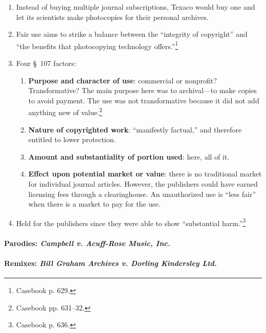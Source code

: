 \begin{enumerate}
    \item Instead of buying multiple journal subscriptions, Texaco would buy 
    one and let its scientists make photocopies for their personal archives.
    \item Fair use aims to strike a balance between the ``integrity of 
    copyright'' and ``the benefits that photocopying technology 
    offers.''\footnote{Casebook p. 629.}
    \item Four \S\ 107 factors:
    \begin{enumerate}
        \item \textbf{Purpose and character of use}: commercial or nonprofit? 
        Transformative?  The main purpose here was to archival---to make 
        copies to avoid payment. The use was not transformative because it did 
        not add anything new of value.\footnote{Casebook pp. 631--32.}
        \item \textbf{Nature of copyrighted work}: ``manifestly factual,'' and 
        therefore entitled to lower protection.
        \item \textbf{Amount and substantiality of portion used}: here, all of 
        it.
        \item \textbf{Effect upon potential market or value}: there is no 
        traditional market for individual journal articles. However, the 
        publishers could have earned licensing fees through a clearinghouse. 
        An unauthorized use is ``less fair'' when there is a market to pay for 
        the use.
    \end{enumerate}
    \item Held for the publishers since they were able to show ``substantial 
    harm.''\footnote{Casebook p. 636.}
\end{enumerate}

\newpage %

\paragraph{Parodies: \emph{Campbell v. Acuff-Rose Music, Inc.}}


\paragraph{Remixes: \emph{Bill Graham Archives v. Dorling Kindersley Ltd.}}


